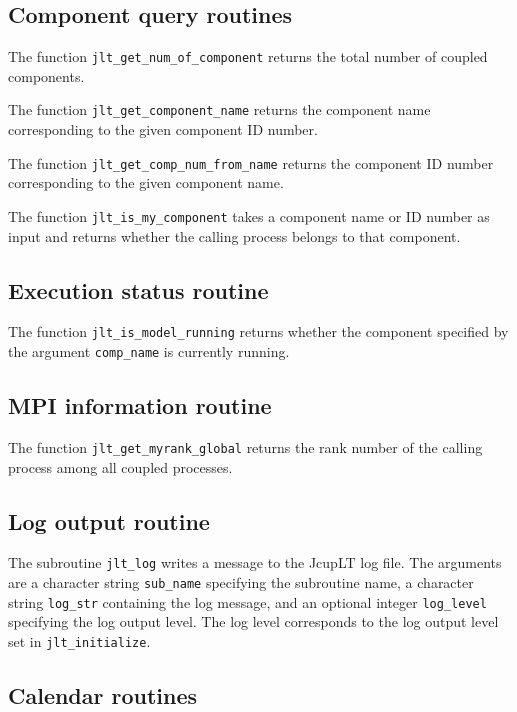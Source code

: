 \documentclass[11pt,a4paper]{report}
\begin{document}
\subsection{Component query routines}

The function \texttt{jlt\_get\_num\_of\_component}
returns the total number of coupled components.

The function \texttt{jlt\_get\_component\_name}
returns the component name
corresponding to the given component ID number.

The function \texttt{jlt\_get\_comp\_num\_from\_name}
returns the component ID number
corresponding to the given component name.

The function \texttt{jlt\_is\_my\_component}
takes a component name or ID number as input
and returns whether the calling process
belongs to that component.

\subsection{Execution status routine}

The function \texttt{jlt\_is\_model\_running}
returns whether the component
specified by the argument \texttt{comp\_name}
is currently running.

\subsection{MPI information routine}

The function \texttt{jlt\_get\_myrank\_global}
returns the rank number of the calling process
among all coupled processes.

\subsection{Log output routine}

The subroutine \texttt{jlt\_log}
writes a message to the JcupLT log file.
The arguments are
a character string \texttt{sub\_name}
specifying the subroutine name,
a character string \texttt{log\_str}
containing the log message,
and an optional integer \texttt{log\_level}
specifying the log output level.
The log level corresponds to
the log output level set in \texttt{jlt\_initialize}.

\subsection{Calendar routines}
\end{document}
